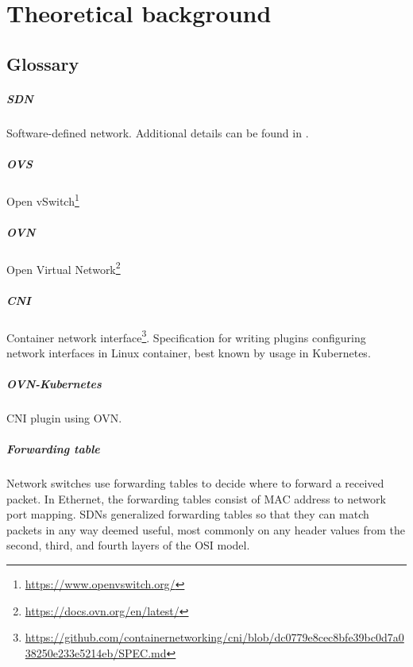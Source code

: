 \chapter{Theoretical background}
\label{chap:refs}

\section{Glossary}

\paragraph{SDN} Software-defined network. Additional details can be found in .

\paragraph{OVS} Open vSwitch\footnote{\url{https://www.openvswitch.org/}}

\paragraph{OVN} Open Virtual Network\footnote{\url{https://docs.ovn.org/en/latest/}}

\paragraph{CNI} Container network interface\footnote{\url{https://github.com/containernetworking/cni/blob/dc0779e8cec8bfe39bc0d7a038250e233e5214eb/SPEC.md}}. Specification for writing plugins configuring network interfaces in Linux container, best known by usage in Kubernetes.

\paragraph{OVN-Kubernetes} CNI plugin using OVN.

\paragraph{Forwarding table} Network switches use forwarding tables to decide where to forward a received packet. In Ethernet, the forwarding tables consist of MAC address to network port mapping. SDNs generalized forwarding tables so that they can match packets in any way deemed useful, most commonly on any header values from the second, third, and fourth layers of the OSI model.


